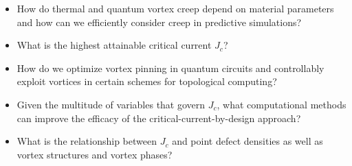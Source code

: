 \documentclass[%
 aip,
 amsmath,amssymb,
 reprint,%
floatfix]{revtex4-1}
\newcommand{\Jc}{J_{c}}
\begin{document}
\begin{itemize}[noitemsep, leftmargin=*]
\item How do thermal and quantum vortex creep depend on material parameters and how can we efficiently consider creep in predictive simulations?

\item What is the highest attainable critical current $\Jc$?

\item How do we optimize vortex pinning in quantum circuits and controllably exploit vortices in certain schemes for topological computing? 

\item Given the multitude of variables that govern $\Jc$, what computational methods can improve the efficacy of the critical-current-by-design approach?

\item What is the relationship between $\Jc$ and point defect densities as well as vortex structures and vortex phases?
\end{itemize}
\end{document}
